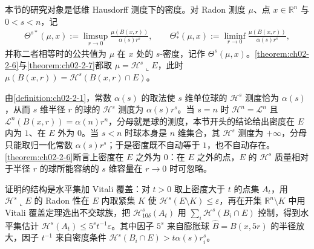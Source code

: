 \documentclass[../../main.tex]{subfiles}%
\begin{document}
\begin{remark}\label{remark:ch02-thm-2-6-动机}
本节的研究对象是低维 Hausdorff 测度下的密度。对 Radon 测度 $\mu$、点 $x\in\mathbb{R}^n$ 与 $0<s<n$，记
\begin{align*}
\Theta^{s*}(\mu,x):=\limsup_{r\to0}\frac{\mu(B(x,r))}{\alpha(s)r^s},\qquad
\Theta^{s}_{*}(\mu,x):=\liminf_{r\to0}\frac{\mu(B(x,r))}{\alpha(s)r^s},
\end{align*}
并称二者相等时的公共值为 $\mu$ 在 $x$ 处的 $s$-密度，记作 $\Theta^s(\mu,x)$。\cref{theorem:ch02-2-6}与\cref{theorem:ch02-2-7}都取 $\mu=\mathcal{H}^s\llcorner E$，此时 $\mu(B(x,r))=\mathcal{H}^s(B(x,r)\cap E)$。%

由\cref{definition:ch02-2-1}，常数 $\alpha(s)$ 的取法使 $s$ 维单位球的 $\mathcal{H}^s$ 测度恰为 $\alpha(s)$，从而 $s$ 维半径 $r$ 的球的 $\mathcal{H}^s$ 测度为 $\alpha(s)r^s$。当 $s=n$ 时 $\mathcal{H}^n=\mathcal{L}^n$ 且 $\mathcal{L}^n(B(x,r))=\alpha(n)r^n$，分母就是球的测度，本节开头的结论给出密度在 $E$ 内为 $1$、在 $E$ 外为 $0$。当 $s<n$ 时球本身是 $n$ 维集合，其 $\mathcal{H}^s$ 测度为 $+\infty$，分母只能取归一化常数 $\alpha(s)r^s$；于是密度既不自动等于 $1$，也不自动存在。\cref{theorem:ch02-2-6}断言上密度在 $E$ 之外为 $0$：在 $E$ 之外的点，$E$ 的 $\mathcal{H}^s$ 质量相对于半径 $r$ 的球所能容纳的 $s$ 维容量在 $r\to0$ 时可忽略。%

证明的结构是水平集加 Vitali 覆盖：对 $t>0$ 取上密度大于 $t$ 的点集 $A_t$，用 $\mathcal{H}^s\llcorner E$ 的 Radon 性在 $E$ 内取紧集 $K$ 使 $\mathcal{H}^s(E\setminus K)\leqslant\varepsilon$，再在开集 $\mathbb{R}^n\setminus K$ 中用 Vitali 覆盖定理选出不交球族，把 $\mathcal{H}^s_{10\delta}(A_t)$ 用 $\sum_i\mathcal{H}^s(B_i\cap E)$ 控制，得到水平集估计 $\mathcal{H}^s(A_t)\leqslant5^st^{-1}\varepsilon$。其中因子 $5^s$ 来自膨胀球 $\hat B=B(x,5r)$ 的半径放大，因子 $t^{-1}$ 来自密度条件 $\mathcal{H}^s(B_i\cap E)>t\alpha(s)r_i^s$。
\end{remark}
\end{document}
